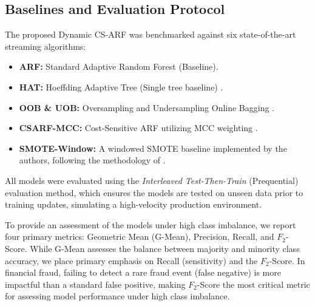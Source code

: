 \documentclass[review,12pt]{elsarticle}
\begin{document}
\subsection{Baselines and Evaluation Protocol}

The proposed Dynamic CS-ARF was benchmarked against six state-of-the-art streaming algorithms:
\begin{itemize}
    \item \textbf{ARF:} Standard Adaptive Random Forest \cite{gomes2017adaptive} (Baseline).
    \item \textbf{HAT:} Hoeffding Adaptive Tree (Single tree baseline) \cite{bifet2009adaptive}.
    \item \textbf{OOB \& UOB:} Oversampling and Undersampling Online Bagging \cite{brzezinskiOnlineOversampling2021}.
    \item \textbf{CSARF-MCC:} Cost-Sensitive ARF utilizing MCC weighting \cite{loezer2020csarf, aguiarCSARF2023}.
    \item \textbf{SMOTE-Window:} A windowed SMOTE baseline implemented by the authors, following the methodology of \cite{bernardoCSMOTE2020, bernardoSMOTEOBCombiningSMOTE2021, chiuSMOClust2024}.
\end{itemize}
All models were evaluated using the \textit{Interleaved Test-Then-Train} (Prequential) evaluation method, which ensures the models are tested on unseen data prior to training updates, simulating a high-velocity production environment. 

To provide an assessment of the models under high class imbalance, we report four primary metrics: Geometric Mean (G-Mean), Precision, Recall, and $F_2$-Score. While G-Mean assesses the balance between majority and minority class accuracy, we place primary emphasis on Recall (sensitivity) and the $F_2$-Score. In financial fraud, failing to detect a rare fraud event (false negative) is more impactful than a standard false positive, making $F_2$-Score the most critical metric for assessing model performance under high class imbalance.
\end{document}
